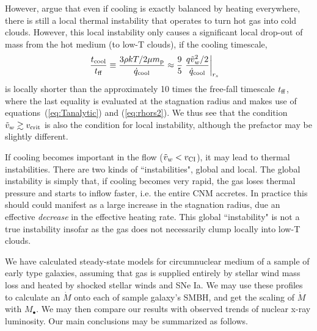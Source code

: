 \documentclass[usenatbib,fleqn]{mn2e}
\newcommand{\Mdot}{\dot{M}}
\newcommand{\rs}{r_s}
\newcommand{\vw}{\tilde{v}_{w}}
\renewcommand{\mp}{m_{\rm p}}
\newcommand{\Mbh}[1][]{M_{\bullet#1}}
\newcommand{\tcool}{t_{\rm cool}}
\newcommand{\tff}{t_{\rm ff}}
\begin{document}
However, \citet{McCourt+12} argue that even if cooling is exactly
balanced by heating everywhere, there is still a local thermal
instability that operates to turn hot gas into cold clouds.  However,
this local instability only causes a significant local drop-out of
mass from the hot medium (to low-T clouds), if the cooling timescale,
\begin{align}
\frac{\tcool}{\tff} &\equiv \frac{3\rho k T/2 \mu \mp}{\dot{q}_{\rm cool}} \approx \frac{9}{5} \left. \frac{q \vw^2/2}{\dot{q}_{\rm cool}}\right|_{\rs}
\end{align} 
is locally shorter than the approximately 10 times the free-fall
timescale $t_{\rm ff}$, where the last equality is evaluated at the
stagnation radius and makes use of equations~(\ref{eq:Tanalytic}) and
(\ref{eq:rhors2}).  We thus see that the condition $\tilde{v}_{w} \gtrsim v_{\rm
  crit}$ is also the condition for local instability, although the
prefactor may be slightly different.


If cooling becomes important in the flow ($\tilde{v}_{w} < v_{\rm CI}$), it may lead to thermal instabilities.  There are two kinds of ``instabilities", global and local.  The global instability is simply that, if cooling becomes very rapid, the gas loses thermal pressure and starts to inflow faster, i.e. the entire CNM accretes.  In
practice this should could manifest as a large increase in the stagnation radius, due an effective {\it decrease} in the effective heating rate.  This global ``instability" is not a true instability insofar as the gas does not necessarily clump locally into low-T clouds.


  We have calculated steady-state models for circumnuclear medium of a
  sample of early type galaxies, assuming that gas is supplied
  entirely by stellar wind mass loss and heated by shocked stellar
  winds and SNe Ia. We may use these profiles to calculate an $\Mdot$
  onto each of sample galaxy's SMBH, and get the scaling of $\Mdot$
  with $\Mbh$. We may then compare our results with observed trends of
  nuclear x-ray luminosity. Our main conclusions may be summarized as
  follows.
\end{document}
